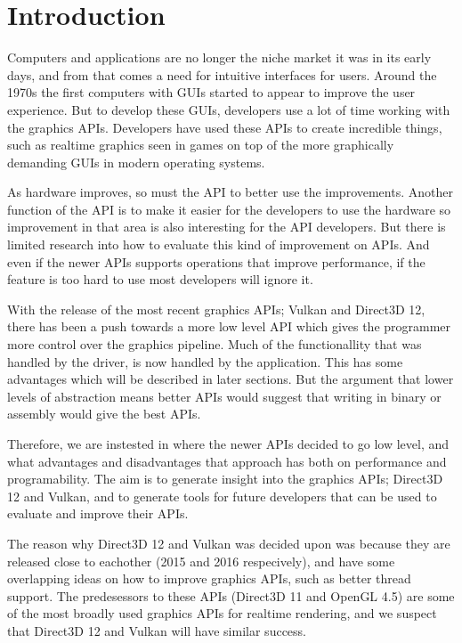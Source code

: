 \chapter{Introduction}\label{ch:introduction}

Computers and applications are no longer the niche market it was in its early days, and from that comes a need for intuitive interfaces for users. 
Around the 1970s the first computers with \glspl{GUI} started to appear to improve the user experience.
But to develop these \glspl{GUI}, developers use a lot of time working with the graphics \glspl{API}.
Developers have used these APIs to create incredible things, such as realtime graphics seen in games on top of the more graphically demanding \glspl{GUI} in modern operating systems.

As hardware improves, so must the \gls{API} to better use the improvements.
Another function of the \gls{API} is to make it easier for the developers to use the hardware so improvement in that area is also interesting for the \gls{API} developers.
But there is limited research into how to evaluate this kind of improvement on \glspl{API}.
And even if the newer \glspl{API} supports operations that improve performance, if the feature is too hard to use most developers will ignore it.

With the release of the most recent graphics \glspl{API}; Vulkan and Direct3D 12, there has been a push towards a more low level API which gives the programmer more control over the graphics pipeline.
Much of the functionallity that was handled by the driver, is now handled by the application. 
This has some advantages which will be described in later sections. 
But the argument that lower levels of abstraction means better \glspl{API} would suggest that writing in binary or assembly would give the best \glspl{API}.

Therefore, we are instested in where the newer \glspl{API} decided to go low level, and what advantages and disadvantages that approach has both on performance and programability.
The aim is to generate insight into the graphics \glspl{API}; Direct3D 12 and Vulkan, and to generate tools for future developers that can be used to evaluate and improve their \glspl{API}.

The reason why Direct3D 12 and Vulkan was decided upon was because they are released close to eachother (2015 and 2016 respecively), and have some overlapping ideas on how to improve graphics \glspl{API}, such as better thread support.
The predesessors to these \glspl{API} (Direct3D 11 and OpenGL 4.5) are some of the most broadly used graphics \glspl{API} for realtime rendering, and we suspect that Direct3D 12 and Vulkan will have similar success.






